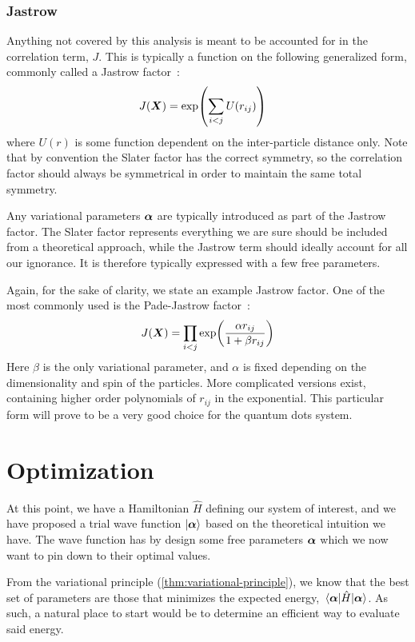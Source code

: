 \documentclass[Thesis.tex]{subfiles}
\begin{document}
\subsubsection*{Jastrow}

Anything not covered by this analysis is meant to be accounted for in the correlation
term, $J$. This is typically a function on the following generalized form, commonly called a Jastrow
factor~\cite{Jastrow-1955}:
\begin{align}
    J(\bm{X}) &= \exp(\sum_{i < j} U(r_{ij}))
\end{align}
where $U(r)$ is some function dependent on the inter-particle distance only. Note that by
convention the Slater factor has the correct symmetry, so the correlation factor should
always be symmetrical in order to maintain the same total symmetry.

Any variational parameters $\bm{\alpha}$ are typically introduced as part of the Jastrow
factor. The Slater factor represents everything we are sure should be included
from a theoretical approach, while the Jastrow term should ideally account for all our ignorance.
It is therefore typically expressed with a few free parameters.

Again, for the sake of clarity, we state an example Jastrow factor. One of the most
commonly used is the Pade-Jastrow factor~\cite{Drummond-Towler-Needs-2008}:
\begin{align}
    J(\bm{X}) = \prod_{i < j} \exp(\frac{\alpha r_{ij}}{1 + \beta r_{ij} } )
\end{align}
Here $\beta$ is the only variational parameter, and $\alpha$ is fixed depending on the
dimensionality and spin of the particles. More complicated versions exist, containing
higher order polynomials of $r_{ij}$ in the exponential. This particular form
will prove to be a very good choice for the quantum dots system.




\section{Optimization}

At this point, we have a Hamiltonian $\hat H$ defining our system of interest,
and we have proposed a trial wave function $| \bm{\alpha} \rangle$ based on the
theoretical intuition we have. The wave function has by design some free
parameters $\bm{\alpha}$ which we now want to pin down to their optimal values.

From the variational principle (\cref{thm:variational-principle}), we know
that the best set of parameters are those that minimizes the expected energy,
$\expval{\hat H}{\bm{\alpha}}$. As such, a natural place to start would be to
determine an efficient way to evaluate said energy.
\end{document}
